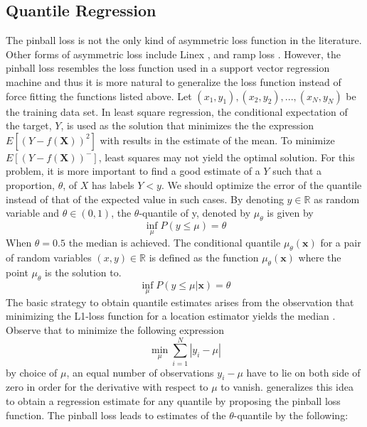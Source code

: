 \documentclass[twoside,11pt]{article}
\begin{document}
\subsection{Quantile Regression}
The pinball loss is not the only kind of asymmetric loss function in the literature. Other forms of asymmetric loss include Linex \citep{Demetrescu07} \citep{Ohtani95}, and ramp loss \citep{Takeuchi06}. However, the pinball loss resembles the loss function used in a support vector regression machine and thus it is more natural to generalize the loss function instead of force fitting the functions listed above. Let $(x_1,y_1),(x_2,y_2),...,(x_N,y_N)$ be the training data set. In least square regression, the conditional expectation of the target, $Y$, is used as the solution that minimizes the the expression $E[(Y-f(\mathbf{X}))^2]$ with results in the estimate of the mean. To minimize $E[(Y-f(\mathbf{X}))^-]$, least squares may not yield the optimal solution. For this problem, it is more important to find a good estimate of a $Y$ such that a proportion, $\theta$, of $X$ has labels $Y<y$. We should optimize the error of the quantile instead of that of the expected value in such cases. By denoting $y \in \mathbb{R}$ as random variable and $\theta \in (0,1)$, the $\theta$-quantile of y, denoted by $\mu_{\theta}$ is given by
 \begin{equation}
 \inf_{\mu}P(y\leq \mu)=\theta
 \end{equation}
When $\theta = 0.5$ the median is achieved. The conditional quantile $\mu_{\theta}(\mathbf{x})$ for a pair of random variables $(x,y) \in \mathbb{R}$ is defined as the function $\mu_{\theta}(\mathbf{x}) $ where the point $\mu_{\theta}$ is the solution to.
 \begin{equation}
 \inf_{\mu}P(y\leq \mu|\mathbf{x})=\theta
 \end{equation}
The basic strategy to obtain quantile estimates arises from the observation that minimizing the L1-loss function for a location estimator yields the median \citep{Hao07}. Observe that to minimize the following expression
\begin{equation}
\min_{\mu}\sum_{i=1}^{N}|y_i-\mu|
 \end{equation}
by choice of $\mu$, an equal number of observations $y_i-\mu$ have to lie on both side of zero in order for the derivative with respect to $\mu$ to vanish. \citet{Koenker01} generalizes this idea to obtain a regression estimate for any quantile by proposing the pinball loss function. The pinball loss leads to estimates of the $\theta$-quantile by the following:
\end{document}
